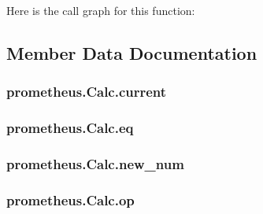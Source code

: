 Here is the call graph for this function\+:




\subsection{Member Data Documentation}
\hypertarget{classprometheus_1_1_calc_a2412692091e25543bb96c1e1abd0572c}{}
\subsubsection[{current}]{\setlength{\rightskip}{0pt plus 5cm}prometheus.\+Calc.\+current}\label{classprometheus_1_1_calc_a2412692091e25543bb96c1e1abd0572c}
\hypertarget{classprometheus_1_1_calc_acea8a5a749f5ddc51608db16bde5c471}{}
\subsubsection[{eq}]{\setlength{\rightskip}{0pt plus 5cm}prometheus.\+Calc.\+eq}\label{classprometheus_1_1_calc_acea8a5a749f5ddc51608db16bde5c471}
\hypertarget{classprometheus_1_1_calc_a8f8b00b547a8f8f12d07d2a70de91780}{}
\subsubsection[{new\+\_\+num}]{\setlength{\rightskip}{0pt plus 5cm}prometheus.\+Calc.\+new\+\_\+num}\label{classprometheus_1_1_calc_a8f8b00b547a8f8f12d07d2a70de91780}
\hypertarget{classprometheus_1_1_calc_aedb9cce0ff1460e79b5c891ec586a2e5}{}
\subsubsection[{op}]{\setlength{\rightskip}{0pt plus 5cm}prometheus.\+Calc.\+op}\label{classprometheus_1_1_calc_aedb9cce0ff1460e79b5c891ec586a2e5}
\hypertarget{classprometheus_1_1_calc_a4418a12226daea13b6ed01e5b1b87c37}{}
